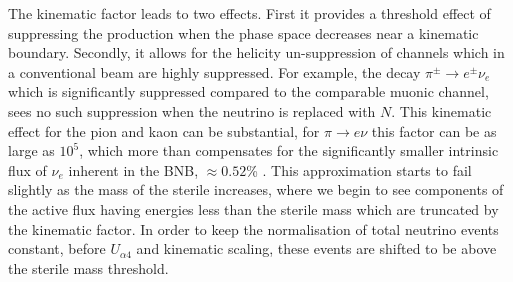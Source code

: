 \documentclass[11pt, a4paper]{article}
\def\ster{\ensuremath N}
\begin{document}
The kinematic factor leads to two effects. First it provides a threshold effect
of suppressing the production when the phase space decreases near a kinematic
boundary.  Secondly, it allows for the helicity un-suppression of channels
which in a conventional beam are highly suppressed. For example, the decay
$\pi^\pm \to e^\pm \nu_e$ which is significantly suppressed compared to the
comparable muonic channel, sees no such suppression when the neutrino is
replaced with $N$.
%
This kinematic effect for the pion and kaon can be substantial, for $\pi
\rightarrow e \nu$ this factor can be as large as $10^5$, which more than
compensates for the significantly smaller intrinsic flux of $\nu_e$ inherent in
the BNB, $\approx 0.52$\% \cite{AguilarArevalo:2008yp}. This approximation
starts to fail slightly as the mass of the sterile increases, where we begin to
see components of the active flux having energies less than the sterile mass
which are truncated by the kinematic factor. In order to keep the normalisation
of total neutrino events constant, before $U_{\alpha 4}$ and kinematic scaling,
these events are shifted to be above the sterile mass threshold.

%
\end{document}
